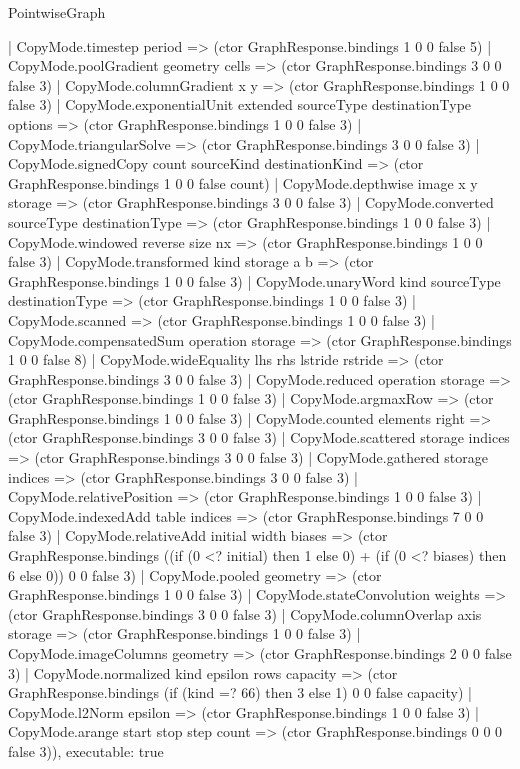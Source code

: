 \begin{lexlean}{PointwiseGraph}
\begin{semanticmodule}
{    | CopyMode.timestep period => (ctor GraphResponse.bindings 1 0 0 false 5)
    | CopyMode.poolGradient geometry cells => (ctor GraphResponse.bindings 3 0 0 false 3)
    | CopyMode.columnGradient x y => (ctor GraphResponse.bindings 1 0 0 false 3)
    | CopyMode.exponentialUnit extended sourceType destinationType options => (ctor GraphResponse.bindings 1 0 0 false 3)
    | CopyMode.triangularSolve => (ctor GraphResponse.bindings 3 0 0 false 3)
    | CopyMode.signedCopy count sourceKind destinationKind => (ctor GraphResponse.bindings 1 0 0 false count)
    | CopyMode.depthwise image x y storage => (ctor GraphResponse.bindings 3 0 0 false 3)
    | CopyMode.converted sourceType destinationType => (ctor GraphResponse.bindings 1 0 0 false 3)
    | CopyMode.windowed reverse size nx => (ctor GraphResponse.bindings 1 0 0 false 3)
    | CopyMode.transformed kind storage a b => (ctor GraphResponse.bindings 1 0 0 false 3)
    | CopyMode.unaryWord kind sourceType destinationType => (ctor GraphResponse.bindings 1 0 0 false 3)
    | CopyMode.scanned => (ctor GraphResponse.bindings 1 0 0 false 3)
    | CopyMode.compensatedSum operation storage => (ctor GraphResponse.bindings 1 0 0 false 8)
    | CopyMode.wideEquality lhs rhs lstride rstride => (ctor GraphResponse.bindings 3 0 0 false 3)
    | CopyMode.reduced operation storage => (ctor GraphResponse.bindings 1 0 0 false 3)
    | CopyMode.argmaxRow => (ctor GraphResponse.bindings 1 0 0 false 3)
    | CopyMode.counted elements right => (ctor GraphResponse.bindings 3 0 0 false 3)
    | CopyMode.scattered storage indices => (ctor GraphResponse.bindings 3 0 0 false 3)
    | CopyMode.gathered storage indices => (ctor GraphResponse.bindings 3 0 0 false 3)
    | CopyMode.relativePosition => (ctor GraphResponse.bindings 1 0 0 false 3)
    | CopyMode.indexedAdd table indices => (ctor GraphResponse.bindings 7 0 0 false 3)
    | CopyMode.relativeAdd initial width biases => (ctor GraphResponse.bindings ((if (0 <? initial) then 1 else 0) + (if (0 <? biases) then 6 else 0)) 0 0 false 3)
    | CopyMode.pooled geometry => (ctor GraphResponse.bindings 1 0 0 false 3)
    | CopyMode.stateConvolution weights => (ctor GraphResponse.bindings 3 0 0 false 3)
    | CopyMode.columnOverlap axis storage => (ctor GraphResponse.bindings 1 0 0 false 3)
    | CopyMode.imageColumns geometry => (ctor GraphResponse.bindings 2 0 0 false 3)
    | CopyMode.normalized kind epsilon rows capacity => (ctor GraphResponse.bindings (if (kind =? 66) then 3 else 1) 0 0 false capacity)
    | CopyMode.l2Norm epsilon => (ctor GraphResponse.bindings 1 0 0 false 3)
    | CopyMode.arange start stop step count => (ctor GraphResponse.bindings 0 0 0 false 3)),
  executable: true
}


\end{semanticmodule}
\end{lexlean}
